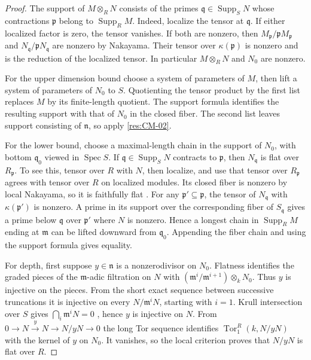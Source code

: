 \documentclass[11pt,oneside,openany]{book}
\theoremstyle{definition}
\theoremstyle{remark}
\begin{document}
\begin{proof}
The support of $M\otimes_R N$ consists of the primes
$\mathfrak q\in\operatorname{Supp}_S N$ whose contractions
$\mathfrak p$ belong to $\operatorname{Supp}_R M$.
Indeed, localize the tensor at $\mathfrak q$. If either
localized factor is zero, the tensor vanishes. If both are
nonzero, then $M_{\mathfrak p}/\mathfrak pM_{\mathfrak p}$
and $N_{\mathfrak q}/\mathfrak pN_{\mathfrak q}$ are nonzero
by Nakayama. Their tensor over $\kappa(\mathfrak p)$ is
nonzero and is the reduction of the localized tensor.
In particular $M\otimes_R N$ and $N_0$ are nonzero.

For the upper dimension bound choose a system of parameters
of $M$, then lift a system of parameters of $N_0$ to $S$.
Quotienting the tensor product by the first list replaces
$M$ by its finite-length quotient. The support formula
identifies the resulting support with that of $N_0$ in
the closed fiber. The second list leaves support consisting
of $\mathfrak n$, so apply \ref{res:CM-02}.

For the lower bound, choose a maximal-length chain in the
support of $N_0$, with bottom $\mathfrak q_0$ viewed in $\operatorname{Spec} S$.
If $\mathfrak q\in\operatorname{Supp}_S N$ contracts to
$\mathfrak p$, then $N_{\mathfrak q}$ is flat over
$R_{\mathfrak p}$. To see this, tensor over $R$ with $N$,
then localize, and use that tensor over $R_{\mathfrak p}$
agrees with tensor over $R$ on localized modules. Its closed
fiber is nonzero by local Nakayama, so it is faithfully
flat \cite[Theorem ALG-03-C02-S04]{p103}. For any
$\mathfrak p'\subseteq\mathfrak p$, the tensor of
$N_{\mathfrak q}$ with $\kappa(\mathfrak p')$ is nonzero.
A prime in its support over the corresponding fiber of
$S_{\mathfrak q}$ gives a prime below $\mathfrak q$ over
$\mathfrak p'$ where $N$ is nonzero. Hence a longest chain
in $\operatorname{Supp}_R M$ ending at $\mathfrak m$ can
be lifted downward from $\mathfrak q_0$. Appending the
fiber chain and using the support formula gives equality.

For depth, first suppose $y\in\mathfrak n$ is a
nonzerodivisor on $N_0$. Flatness identifies the graded
pieces of the $\mathfrak m$-adic filtration on $N$ with
$(\mathfrak m^i/\mathfrak m^{i+1})\otimes_k N_0$. Thus
$y$ is injective on the pieces. From the short exact sequence
between successive truncations it is injective on every
$N/\mathfrak m^iN$, starting with $i=1$.
Krull intersection over $S$ gives $\bigcap_i\mathfrak m^iN=0$
\cite[Theorem ALG-05-C04-R04]{p103}, hence $y$ is injective
on $N$. From $0\to N\xrightarrow{y}N\to N/yN\to0$
the long Tor sequence identifies $\operatorname{Tor}_1^R(k,N/yN)$
with the kernel of $y$ on $N_0$. It vanishes, so the local
criterion \cite[Theorem ALG-05-C04-S03]{p103} proves that
$N/yN$ is flat over $R$.


\end{proof}
\end{document}

